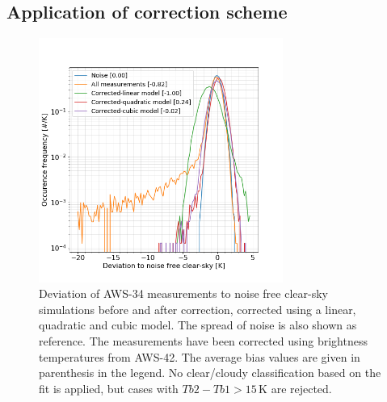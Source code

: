 \documentclass[12pt]{article}
\begin{document}


\subsection{Application of correction scheme}
\begin{figure}[!p]
	\centering
	\includegraphics[clip,trim=0 0 0 0,height=80mm]{PDF_corrected_AWS-34_AWS-42}
	\caption{Deviation of AWS-34 measurements to noise free clear-sky
      simulations before and after correction, corrected using a linear,
      quadratic and cubic model. The spread of noise is also shown as
      reference. The measurements have been corrected using brightness
      temperatures from AWS-42. The average bias values are given in parenthesis in the legend. No clear/cloudy classification based on the fit is applied, but cases with $Tb2 - Tb1 > 15$\,K are rejected.}
	\label{fig:correction:c34-42}
\end{figure}
%
\end{document}
